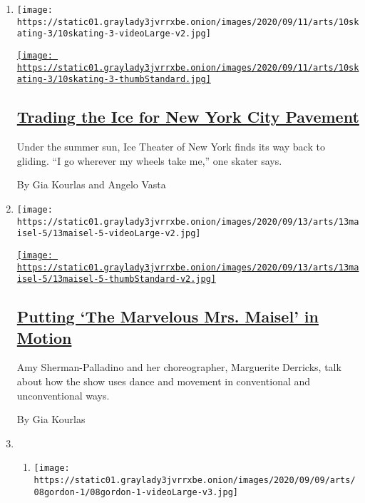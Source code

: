 \begin{enumerate}
\def\labelenumi{\arabic{enumi}.}
\item
  \texttt{[image: https://static01.graylady3jvrrxbe.onion/images/2020/09/11/arts/10skating-3/10skating-3-videoLarge-v2.jpg]}

  \href{/2020/09/10/arts/dance/ice-theater-of-new-york-on-pavement.html}{\texttt{[image: https://static01.graylady3jvrrxbe.onion/images/2020/09/11/arts/10skating-3/10skating-3-thumbStandard.jpg]}}

  \hypertarget{trading-the-ice-for-new-york-city-pavement}{%
  \subsection{\texorpdfstring{\href{/2020/09/10/arts/dance/ice-theater-of-new-york-on-pavement.html}{Trading
  the Ice for New York City
  Pavement}}{Trading the Ice for New York City Pavement}}\label{trading-the-ice-for-new-york-city-pavement}}

  Under the summer sun, Ice Theater of New York finds its way back to
  gliding. ``I go wherever my wheels take me,'' one skater says.

  By Gia Kourlas and Angelo Vasta
\item
  \texttt{[image: https://static01.graylady3jvrrxbe.onion/images/2020/09/13/arts/13maisel-5/13maisel-5-videoLarge-v2.jpg]}

  \href{/2020/09/09/arts/dance/mrs-maisel-amy-sherman-palladino-marguerite-derricks.html}{\texttt{[image: https://static01.graylady3jvrrxbe.onion/images/2020/09/13/arts/13maisel-5/13maisel-5-thumbStandard-v2.jpg]}}

  \hypertarget{putting-the-marvelous-mrs-maisel-in-motion}{%
  \subsection{\texorpdfstring{\href{/2020/09/09/arts/dance/mrs-maisel-amy-sherman-palladino-marguerite-derricks.html}{Putting
  `The Marvelous Mrs. Maisel' in
  Motion}}{Putting `The Marvelous Mrs. Maisel' in Motion}}\label{putting-the-marvelous-mrs-maisel-in-motion}}

  Amy Sherman-Palladino and her choreographer, Marguerite Derricks, talk
  about how the show uses dance and movement in conventional and
  unconventional ways.

  By Gia Kourlas
\item
  \begin{enumerate}
  \def\labelenumii{\arabic{enumii}.}
  \item
    \texttt{[image: https://static01.graylady3jvrrxbe.onion/images/2020/09/09/arts/08gordon-1/08gordon-1-videoLarge-v3.jpg]}


\end{enumerate}
\end{enumerate}
